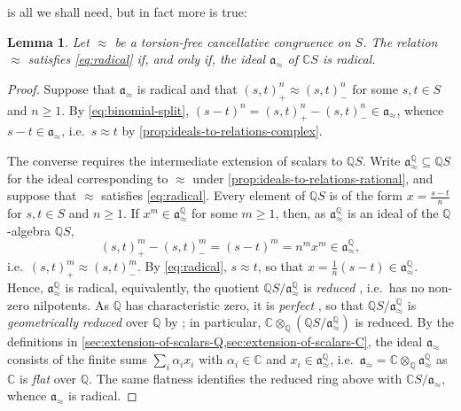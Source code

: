 \documentclass[11pt]{scrartcl}
\theoremstyle{definition}
\theoremstyle{plain}
\newtheorem{lemma}[definition]{Lemma}
\theoremstyle{remark}
\begin{document}
	 is all we shall need,
		but in fact more is true:

	\begin{lemma}\label{lem:radical-ideal}
		Let $\approx$ be a torsion-free cancellative congruence on $S$.
		The relation $\approx$ satisfies \eqref{eq:radical}
		if, and only if, the ideal $\mathfrak{a}_{\approx}$ of $\mathbb{C}S$ is radical.
	\end{lemma}
	\begin{proof}
		Suppose that $\mathfrak{a}_{\approx}$ is radical
		and that $(s, t)^n_+ \approx (s,t)^n_-$ for some $s, t \in S$ and $n \geq 1$.
		By \eqref{eq:binomial-split}, $(s-t)^n = (s, t)^n_+ - (s,t)^n_- \in \mathfrak{a}_{\approx}$,
		whence $s - t \in \mathfrak{a}_{\approx}$, i.e.\ $s \approx t$ by \cref{prop:ideals-to-relations-complex}.

		The converse requires the intermediate extension of scalars to $\mathbb{Q}S$.
		Write $\mathfrak{a}^{\mathbb{Q}}_{\approx} \subseteq \mathbb{Q}S$ for the ideal
		corresponding to $\approx$ under \cref{prop:ideals-to-relations-rational},
		and suppose that $\approx$ satisfies \eqref{eq:radical}.
		Every element of $\mathbb{Q}S$ is of the form $x = \frac{s-t}{n}$ for $s,t \in S$ and $n \geq 1$.
		If $x^m \in \mathfrak{a}^{\mathbb{Q}}_{\approx}$ for some $m \geq 1$,
		then, as $\mathfrak{a}^{\mathbb{Q}}_{\approx}$ is an ideal of the $\mathbb{Q}$-algebra $\mathbb{Q}S$,
		\[
			(s, t)^m_+ - (s,t)^m_- = (s-t)^m = n^m x^m \in \mathfrak{a}^{\mathbb{Q}}_{\approx},
		\]
		i.e.\ $(s, t)^m_+ \approx (s,t)^m_-$.
		By \eqref{eq:radical}, $s \approx t$, so that $x = \frac1n (s-t) \in \mathfrak{a}^{\mathbb{Q}}_{\approx}$.
		Hence, $\mathfrak{a}^{\mathbb{Q}}_{\approx}$ is radical,
		equivalently, the quotient $\mathbb{Q}S / \mathfrak{a}^{\mathbb{Q}}_{\approx}$ is
		\emph{reduced} \cite[\href{https://stacks.math.columbia.edu/tag/01IZ}{Tag 01IZ}]{STACKS},
		i.e.\ has no non-zero nilpotents.
		As $\mathbb{Q}$ has characteristic zero, it is
		\emph{perfect} \cite[\href{https://stacks.math.columbia.edu/tag/030Y}{Tag 030Y}]{STACKS},
		so that $\mathbb{Q}S / \mathfrak{a}^{\mathbb{Q}}_{\approx}$ is
		\emph{geometrically reduced} \cite[\href{https://stacks.math.columbia.edu/tag/030S}{Tag 030S}]{STACKS}
		over $\mathbb{Q}$ by \cite[\href{https://stacks.math.columbia.edu/tag/00I4}{Tag 00I4}]{STACKS};
		in particular, $\mathbb{C} \otimes_{\mathbb{Q}} \left(\mathbb{Q}S / \mathfrak{a}^{\mathbb{Q}}_{\approx}\right)$ is reduced.
		By the definitions in \cref{sec:extension-of-scalars-Q,sec:extension-of-scalars-C},
		the ideal $\mathfrak{a}_{\approx}$ consists of the finite sums $\sum_i \alpha_i x_i$
		with $\alpha_i \in \mathbb{C}$ and $x_i \in \mathfrak{a}^{\mathbb{Q}}_{\approx}$,
		i.e.\ $\mathfrak{a}_{\approx} = \mathbb{C} \otimes_{\mathbb{Q}} \mathfrak{a}^{\mathbb{Q}}_{\approx}$
		as $\mathbb{C}$ is \emph{flat} \cite[\href{https://stacks.math.columbia.edu/tag/00HB}{Tag 00HB}]{STACKS} over $\mathbb{Q}$.
		The same flatness identifies the reduced ring above with $\mathbb{C}S / \mathfrak{a}_{\approx}$,
		whence $\mathfrak{a}_{\approx}$ is radical.
	\end{proof}
\end{document}
